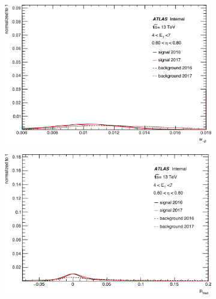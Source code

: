 \begin{figure}[p]
\begin{subfigure}[b]{0.49\textwidth}
    \label{fig:egamma:trig_deltaPhi_res_lowet}
  \end{subfigure}
  \hfill
  \begin{subfigure}[b]{0.49\textwidth}
    \centering
    \includegraphics[width=1.0\textwidth]{figs/egamma/trig_weta2_lowet.png} 
    \label{fig:egamma:trig_weta2_lowet}
  \end{subfigure}
  \begin{subfigure}[b]{0.49\textwidth}
      \centering
    \includegraphics[width=1.0\textwidth]{figs/egamma/trig_rhad_lowet.png} 
    \label{fig:egamma:trig_rhad_lowet}
  \end{subfigure}
  \hfill
  \begin{subfigure}[b]{0.49\textwidth}
    \centering

\end{subfigure}
\end{figure}
